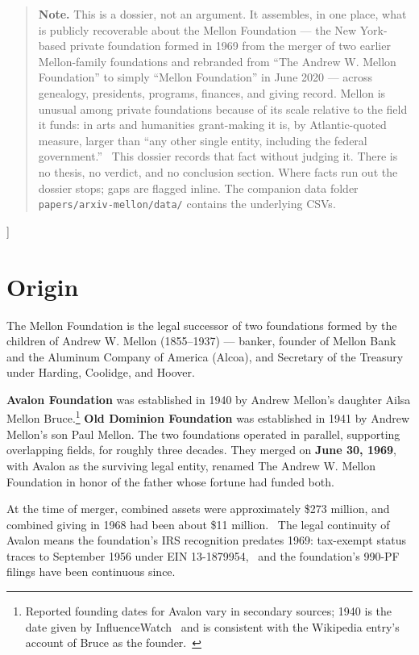 \documentclass[10pt,letterpaper,twocolumn]{article}
\begin{document}
{\begin{quote}
\small\noindent\textbf{Note.} This is a dossier, not an argument. It assembles, in one place, what is publicly recoverable about the Mellon Foundation --- the New York-based private foundation formed in 1969 from the merger of two earlier Mellon-family foundations and rebranded from ``The Andrew W. Mellon Foundation'' to simply ``Mellon Foundation'' in June 2020 --- across genealogy, presidents, programs, finances, and giving record. Mellon is unusual among private foundations because of its scale relative to the field it funds: in arts and humanities grant-making it is, by Atlantic-quoted measure, larger than ``any other single entity, including the federal government.''~\citep{atlantic2023mellon} This dossier records that fact without judging it. There is no thesis, no verdict, and no conclusion section. Where facts run out the dossier stops; gaps are flagged inline. The companion data folder \texttt{papers/arxiv-mellon/data/} contains the underlying CSVs.
\end{quote}
\vspace{0.5em}
}]

\section{Origin}

The Mellon Foundation is the legal successor of two foundations formed by the children of Andrew W. Mellon (1855--1937) --- banker, founder of Mellon Bank and the Aluminum Company of America (Alcoa), and Secretary of the Treasury under Harding, Coolidge, and Hoover.

\textbf{Avalon Foundation} was established in 1940 by Andrew Mellon's daughter Ailsa Mellon Bruce.\footnote{Reported founding dates for Avalon vary in secondary sources; 1940 is the date given by InfluenceWatch~\citep{influencewatchmellon} and is consistent with the Wikipedia entry's account of Bruce as the founder.~\citep{wikipediamellon}} \textbf{Old Dominion Foundation} was established in 1941 by Andrew Mellon's son Paul Mellon. The two foundations operated in parallel, supporting overlapping fields, for roughly three decades. They merged on \textbf{June 30, 1969}, with Avalon as the surviving legal entity, renamed The Andrew W. Mellon Foundation in honor of the father whose fortune had funded both.~\citep{mellonhistory,influencewatchmellon}

At the time of merger, combined assets were approximately \$273 million, and combined giving in 1968 had been about \$11 million.~\citep{influencewatchmellon} The legal continuity of Avalon means the foundation's IRS recognition predates 1969: tax-exempt status traces to September 1956 under EIN 13-1879954,~\citep{propublicamellon} and the foundation's 990-PF filings have been continuous since.
\end{document}
